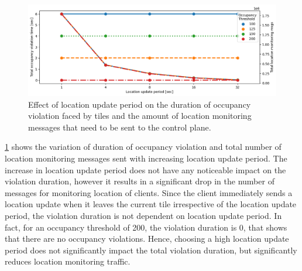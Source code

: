\begin{figure}
\centering
\includegraphics[width=\linewidth]{figures/design_space/spatial/loc_update_period_tradeoff.png}
\caption{Effect of location update period on the duration of occupancy violation faced by tiles and the amount of location monitoring messages that need to be sent to the control plane.}
\label{fig:location_update_period}
\end{figure}
\cref{fig:location_update_period} shows the variation of duration of occupancy violation and total number of location monitoring messages sent with increasing location update period. The increase in location update period does not have any noticeable impact on the violation duration, however it results in a significant drop in the number of messages for monitoring location of clients. Since the client immediately sends a location update when it leaves the current tile irrespective of the location update period, the violation duration is not dependent on location update period. In fact, for an occupancy threshold of 200, the violation duration is 0, that shows that there are no occupancy violations. Hence, choosing a high location update period does not significantly impact the total violation duration, but significantly reduces location monitoring traffic.

